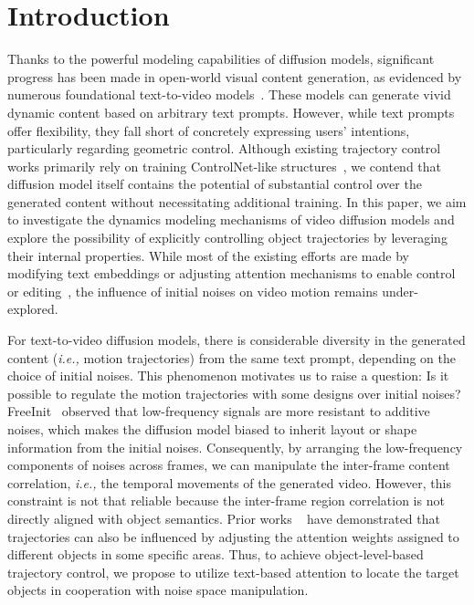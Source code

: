 \section{Introduction}
\label{introduction}

Thanks to the powerful modeling capabilities of diffusion models, significant progress has been made in open-world visual content generation, as evidenced by numerous foundational text-to-video models~\citep{wang2023modelscope,chen2024videocrafter2}. These models can generate vivid dynamic content based on arbitrary text prompts. However, while text prompts offer flexibility, they fall short of concretely expressing users' intentions, particularly regarding geometric control. 
%
Although existing trajectory control works primarily rely on training ControlNet-like structures~\citep{videocomposer,controlavideo}, we contend that diffusion model itself contains the potential of substantial control over the generated content without necessitating additional training.
%
In this paper, we aim to investigate the dynamics modeling mechanisms of video diffusion models and explore the possibility of explicitly controlling object trajectories by leveraging their internal properties. While most of the existing efforts are made by modifying text embeddings or adjusting attention mechanisms to enable control or editing~\citep{ren2024move,geyer2023tokenflow}, the influence of initial noises on video motion remains under-explored.

For text-to-video diffusion models, there is considerable diversity in the generated content (\textit{i.e.,} motion trajectories) from the same text prompt, depending on the choice of initial noises. This phenomenon motivates us to raise a question: Is it possible to regulate the motion trajectories with some designs over initial noises?
FreeInit~\citep{wu2023freeinit} observed that low-frequency signals are more resistant to additive noises, which makes the diffusion model biased to inherit layout or shape information from the initial noises. Consequently, by arranging the low-frequency components of noises across frames, we can manipulate the inter-frame content correlation, \textit{i.e.,} the temporal movements of the generated video. However, this constraint is not that reliable because the inter-frame region correlation is not directly aligned with object semantics.
Prior works ~\citep{jain2023peekaboo,ma2023trailblazer} have demonstrated that trajectories can also be influenced by adjusting the attention weights assigned to different objects in some specific areas. Thus, to achieve object-level-based trajectory control, we propose to utilize text-based attention to locate the target objects in cooperation with noise space manipulation.

